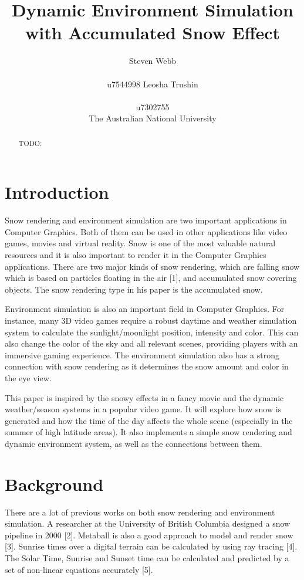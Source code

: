 \documentclass{article}
\title{Dynamic Environment Simulation with Accumulated Snow Effect}
\author{%
  Steven Webb\\\\
  u7544998 
   \And
  Leosha Trushin\\\\
  u7302755\\
  \AND  The Australian National University 
}
\begin{document}
\maketitle

\begin{abstract}
TODO:
\end{abstract}

\section{Introduction}
Snow rendering and environment simulation are two important applications in Computer Graphics. Both of them can be used in other 
applications like video games, movies and virtual reality. Snow is one of the most valuable natural resources and it is also
important to render it in the Computer Graphics applications. There are two major kinds of snow rendering, which are falling snow 
which is based on particles floating in the air [1], and accumulated snow covering objects. The snow rendering type in his paper 
is the accumulated snow.

Environment simulation is also an important field in Computer Graphics. For instance, many 3D video games require a robust daytime
and weather simulation system to calculate the sunlight/moonlight position, intensity and color. This can also change the color of 
the sky and all relevant scenes, providing players with an immersive gaming experience. The environment simulation also has a strong 
connection with snow rendering as it determines the snow amount and color in the eye view. 

This paper is inspired by the snowy effects in a fancy movie and the dynamic weather/season systems in a popular video game. It will 
explore how snow is generated and how the time of the day affects the whole scene (especially in the summer of high latitude areas).
It also implements a simple snow rendering and dynamic environment system, as well as the connections between them.

\section{Background}
There are a lot of previous works on both snow rendering and environment simulation. A researcher at the University of British 
Columbia designed a snow pipeline in 2000 [2]. Metaball is also a good approach to model and render snow [3]. Sunrise times over a 
digital terrain can be calculated by using ray tracing [4]. The Solar Time, Sunrise and Sunset time can be calculated and predicted 
by a set of non-linear equations accurately [5].
\end{document}
